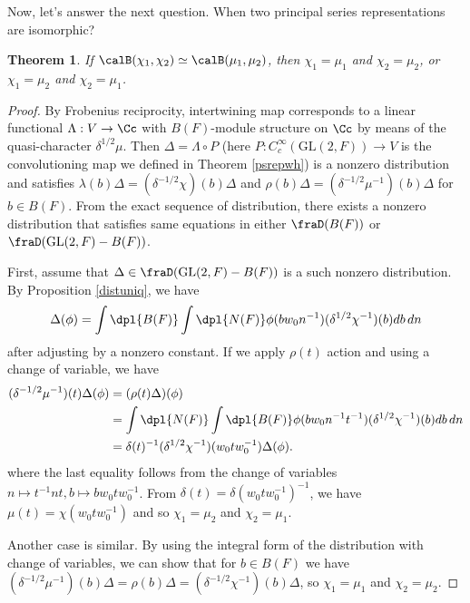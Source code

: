 \documentclass{article}
\newtheorem{theorem}{Theorem}[section]
\newcommand{\GL}{\mathrm{GL}}
\begin{document}
Now, let's answer the next question. When two principal series representations  are isomorphic?
\begin{theorem}
If $\calB(\chi_1, \chi_2)\simeq \calB(\mu_1, \mu_2)$, then $\chi_1 = \mu_1$ and $\chi_2 = \mu_2$, or $\chi_1 = \mu_2$ and $\chi_2 = \mu_1$. 
\end{theorem}
\begin{proof}
By Frobenius reciprocity, intertwining map corresponds to a linear functional $\Lambda:V\to \Cc$ with $B(F)$-module structure on $\Cc$ by means of the quasi-character $\delta^{1/2}\mu$. 
Then $\Delta = \Lambda \circ P$ (here $P:C_{c}^{\infty}(\GL(2, F))\to V$ is the convolutioning map we defined in Theorem \ref{psrepwh})  is a nonzero distribution and satisfies $\lambda(b)\Delta = (\delta^{-1/2}\chi)(b)\Delta$ and $\rho(b)\Delta = (\delta^{-1/2}\mu^{-1})(b)\Delta$ for $b\in B(F)$. 
From the exact sequence of distribution, there exists a nonzero distribution that satisfies same equations in either $\fraD(B(F))$ or $\fraD(\GL(2, F) - B(F))$. 

First, assume that  $\Delta\in \fraD(\GL(2, F) - B(F))$ is a such nonzero distribution. By Proposition \ref{distuniq}, we have
$$
\Delta(\phi) = \int\dpl{B(F)}\int\dpl{N(F)} \phi(bw_{0}n^{-1}) (\delta^{1/2}\chi^{-1})(b) db\,dn
$$
after adjusting by a nonzero constant. If we apply $\rho(t)$ action and using a change of variable, we have
\begin{align*}
(\delta^{-1/2}\mu^{-1})(t)\Delta(\phi) &= (\rho(t)\Delta)(\phi) \\
&=\int\dpl{N(F)}\int\dpl{B(F)} \phi(bw_{0}n^{-1}t^{-1})(\delta^{1/2}\chi^{-1})(b)db\,dn \\
&=\delta(t)^{-1}(\delta^{1/2}\chi^{-1})(w_{0}tw_{0}^{-1})\Delta(\phi).
\end{align*}
where the last equality follows from the change of variables $n\mapsto t^{-1}nt, b\mapsto bw_{0}tw_{0}^{-1}$. From $\delta(t) = \delta(w_{0}tw_{0}^{-1})^{-1}$, we have $\mu(t) = \chi(w_{0}tw_{0}^{-1})$ and so $\chi_1 = \mu_2$ and $\chi_2 = \mu_1$. 

Another case is similar. By using the integral form of the distribution with change of variables, we can show that for $b\in B(F)$ we have $(\delta^{-1/2}\mu^{-1})(b)\Delta = \rho(b)\Delta = (\delta^{-1/2}\chi^{-1})(b)\Delta$, so $\chi_1 = \mu_1$ and $\chi_2 = \mu_2$. 
\end{proof}
\end{document}
